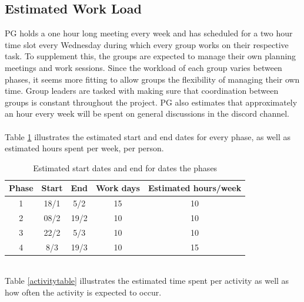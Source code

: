 \documentclass{article}
\begin{document}
    \subsection{Estimated Work Load}
        PG holds a one hour long meeting every week and has scheduled for a two hour time slot every Wednesday during which every group works on their respective task. To supplement this, the groups are expected to manage their own planning meetings and work sessions. Since the workload of each group varies between phases, it seems more fitting to allow groups the flexibility of managing their own time. Group leaders are tasked with making sure that coordination between groups is constant throughout the project. PG also estimates that approximately an hour every week will be spent on general discussions in the discord channel.
        \\ \\
        Table \ref{phasetable} illustrates the estimated start and end dates 
        for every phase, as well as estimated hours spent per week, per person.
        \begin{table}[h]
            \centering
            \begin{tabular}{|c|c|c|c|c|}
                \hline
                    \textbf{Phase} & \textbf{Start} & \textbf{End} & \textbf{Work days} & 
                    \textbf{Estimated hours/week} \\
                \hline
                    1 & 18/1 & 5/2 & 15 & 10 \\
                 \hline
                    2 & 08/2 & 19/2 & 10 & 10 \\
                 \hline
                    3 & 22/2 & 5/3  & 10 & 10 \\
                 \hline
                    4 & 8/3 & 19/3  & 10 & 15 \\
                 \hline
            \end{tabular}
            \caption{Estimated start dates and end for dates the phases}
            \label{phasetable}
        \end{table}
        \\
        Table \ref{activitytable} illustrates the estimated time spent per
        activity as well as how often the activity is expected to occur.
        
\end{document}
